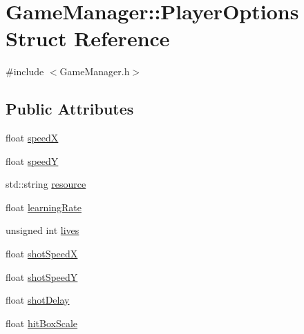 \hypertarget{struct_game_manager_1_1_player_options}{
\section{GameManager::PlayerOptions Struct Reference}
\label{d1/d06/struct_game_manager_1_1_player_options}
}


{\ttfamily \#include $<$GameManager.h$>$}

\subsection*{Public Attributes}
\begin{DoxyCompactItemize}
\item 
float \hyperlink{struct_game_manager_1_1_player_options_aa43239aad5c3ccaf3fd3b8235d30f278}{speedX}
\item 
float \hyperlink{struct_game_manager_1_1_player_options_a84dc56299246c50f5152ad4502113666}{speedY}
\item 
std::string \hyperlink{struct_game_manager_1_1_player_options_a6de1d4b6f906eda7e334b1a00d503379}{resource}
\item 
float \hyperlink{struct_game_manager_1_1_player_options_a4e5e2e7f473e9b024378cb6a4584de59}{learningRate}
\item 
unsigned int \hyperlink{struct_game_manager_1_1_player_options_a4df53166eb1cd9e4b53ab3f7e34b5fc7}{lives}
\item 
float \hyperlink{struct_game_manager_1_1_player_options_a595fcd92d9a0504bf6c453a39d98c347}{shotSpeedX}
\item 
float \hyperlink{struct_game_manager_1_1_player_options_a8f425e5b91ef5818895ef3b0a8edf82b}{shotSpeedY}
\item 
float \hyperlink{struct_game_manager_1_1_player_options_a545c3a94ae3065c7b9d1c1deecfcf618}{shotDelay}
\item 
float \hyperlink{struct_game_manager_1_1_player_options_af610d501999845b0a927ce4522cc7ac9}{hitBoxScale}
\end{DoxyCompactItemize}


